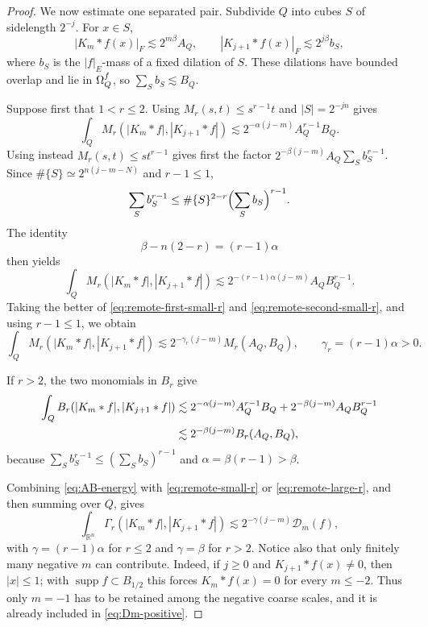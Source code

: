 \documentclass[10pt,a4paper]{amsart}
\numberwithin{equation}{section}
\newcommand{\R}{\mathbb R}
\newcommand{\supp}{\operatorname{supp}}
\begin{document}
\begin{proof}
We now estimate one separated pair.  Subdivide $Q$ into cubes $S$ of
sidelength $2^{-j}$.  For $x\in S$,
\begin{equation}\label{eq:remote-pointwise}
 |K_m*f(x)|_F\lesssim2^{m\beta}A_Q,
 \qquad
 |K_{j+1}*f(x)|_F\lesssim2^{j\beta}b_S,
\end{equation}
where $b_S$ is the $|f|_E$-mass of a fixed dilation of $S$.  These dilations
have bounded overlap and lie in $\Omega_Q^{\rm f}$, so
$\sum_Sb_S\lesssim B_Q$.

Suppose first that $1<r\le2$.  Using $M_r(s,t)\le s^{r-1}t$ and
$|S|=2^{-jn}$ gives
\begin{equation}\label{eq:remote-first-small-r}
 \int_QM_r(|K_m*f|,|K_{j+1}*f|)
 \lesssim2^{-\alpha(j-m)}A_Q^{r-1}B_Q.
\end{equation}
Using instead $M_r(s,t)\le st^{r-1}$ gives first the factor
$2^{-\beta(j-m)}A_Q\sum_Sb_S^{r-1}$.  Since
$\#\{S\}\simeq2^{n(j-m-N)}$ and $r-1\le1$,
\[
 \sum_Sb_S^{r-1}
 \le \#\{S\}^{2-r}\Bigl(\sum_Sb_S\Bigr)^{r-1}.
\]
The identity
\begin{equation}\label{eq:small-r-exponent}
 \beta-n(2-r)=(r-1)\alpha
\end{equation}
then yields
\begin{equation}\label{eq:remote-second-small-r}
 \int_QM_r(|K_m*f|,|K_{j+1}*f|)
 \lesssim2^{-(r-1)\alpha(j-m)}A_QB_Q^{r-1}.
\end{equation}
Taking the better of \eqref{eq:remote-first-small-r} and
\eqref{eq:remote-second-small-r}, and using $r-1\le1$, we obtain
\begin{equation}\label{eq:remote-small-r}
 \int_QM_r(|K_m*f|,|K_{j+1}*f|)
 \lesssim2^{-\gamma_r(j-m)}M_r(A_Q,B_Q),
 \qquad \gamma_r=(r-1)\alpha>0.
\end{equation}

If $r>2$, the two monomials in $B_r$ give
\begin{align}
 \int_QB_r(|K_m*f|,|K_{j+1}*f|)
 &\lesssim2^{-\alpha(j-m)}A_Q^{r-1}B_Q
       +2^{-\beta(j-m)}A_QB_Q^{r-1}\notag\\
 &\lesssim2^{-\beta(j-m)}B_r(A_Q,B_Q),
 \label{eq:remote-large-r}
\end{align}
because $\sum_Sb_S^{r-1}\le(\sum_Sb_S)^{r-1}$ and
$\alpha=\beta(r-1)>\beta$.

Combining \eqref{eq:AB-energy} with \eqref{eq:remote-small-r} or
\eqref{eq:remote-large-r}, and then summing over $Q$, gives
\begin{equation}\label{eq:remote-Dm}
 \int_{\R^n}\Gamma_r(|K_m*f|,|K_{j+1}*f|)
 \lesssim2^{-\gamma(j-m)}\mathcal D_m(f),
\end{equation}
with $\gamma=(r-1)\alpha$ for $r\le2$ and $\gamma=\beta$ for $r>2$.
Notice also that only finitely many negative $m$ can contribute.  Indeed, if
$j\ge0$ and $K_{j+1}*f(x)\ne0$, then $|x|\le1$; with
$\supp f\subset B_{1/2}$ this forces $K_m*f(x)=0$ for every $m\le-2$.
Thus only $m=-1$ has to be retained among the negative coarse scales, and it
is already included in \eqref{eq:Dm-positive}.


\end{proof}
\end{document}

